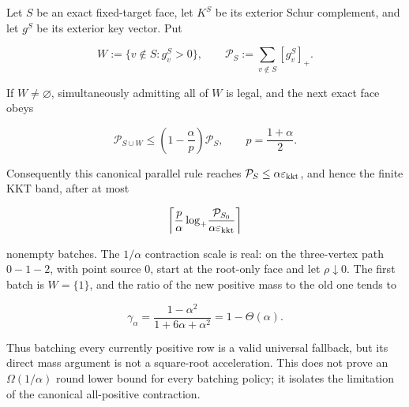 \begin{proposition}
\label{prop:aesp-cd-point-source-parallel-batch-contraction}
Let \(S\) be an exact fixed-target face, let \(K^S\) be its exterior Schur
complement, and let \(g^S\) be its exterior key vector.  Put

\begin{equation*}
 W:=\{v\notin S:g^S_v>0\},
 \qquad
 \mathcal P_S:=\sum_{v\notin S}[g^S_v]_+.
\end{equation*}

If \(W\neq\varnothing\), simultaneously admitting all of \(W\) is legal,
and the next exact face obeys

\begin{equation}
 \mathcal P_{S\cup W}
 \leq
 \left(1-\frac{\alpha}{p}\right)\mathcal P_S,
 \qquad p=\frac{1+\alpha}{2}.
 \label{eq:aesp-cd-point-source-parallel-batch-contraction}
\end{equation}

Consequently this canonical parallel rule reaches
\(\mathcal P_S\leq\alpha\varepsilon_{\mathrm{kkt}}\), and hence the finite KKT band, after at
most

\begin{equation*}
 \left\lceil
  \frac{p}{\alpha}
  \log_+\!\frac{\mathcal P_{S_0}}{\alpha\varepsilon_{\mathrm{kkt}}}
 \right\rceil
\end{equation*}

nonempty batches.  The \(1/\alpha\) contraction scale is real: on the
three-vertex path \(0-1-2\), with point source \(0\), start at the root-only
face and let \(\rho\downarrow0\).  The first batch is \(W=\{1\}\), and the
ratio of the new positive mass to the old one tends to

\begin{equation}
 \gamma_\alpha
 =\frac{1-\alpha^2}{1+6\alpha+\alpha^2}
 =1-\Theta(\alpha).
 \label{eq:aesp-cd-point-source-parallel-batch-sharp}
\end{equation}

Thus batching every currently positive row is a valid universal fallback,
but its direct mass argument is not a square-root acceleration.  This does
not prove an \(\Omega(1/\alpha)\) round lower bound for every batching policy;
it isolates the limitation of the canonical all-positive contraction.
\end{proposition}

